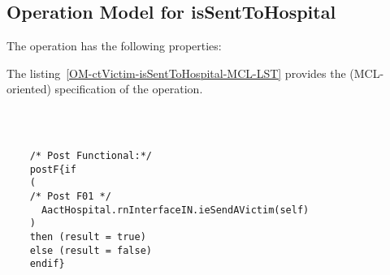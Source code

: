 \subsection{Operation Model for isSentToHospital}

\label{OM-isSentToHospital}


The  operation has the following properties:

	\begin{operationmodel}



		


	\end{operationmodel}



	\vspace{1cm}
	The listing~\ref{OM-ctVictim-isSentToHospital-MCL-LST} provides the \msrmessir (MCL-oriented) specification of the operation.
	
	\scriptsize
	\vspace{0.5cm}
	\begin{lstlisting}[style=MessirStyle,firstnumber=auto,captionpos=b,caption={\msrmessir (MCL-oriented) specification of the operation \emph{isSentToHospital}.},label=OM-ctVictim-isSentToHospital-MCL-LST]

	
	
	/* Post Functional:*/ 
	postF{if 
	(
	/* Post F01 */
	  AactHospital.rnInterfaceIN.ieSendAVictim(self)
	)
	then (result = true)
	else (result = false)
	endif}
	
	
	\end{lstlisting}
	\normalsize 
	
	
	
	





